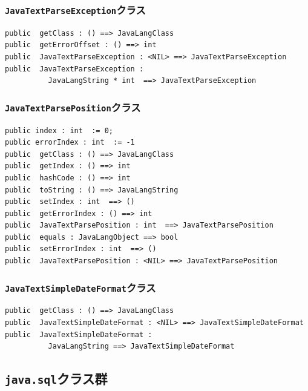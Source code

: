 \documentclass[\pformat,12pt]{jarticle}
\begin{document}
\subsubsection{\texttt{JavaTextParseException}クラス}
\begin{small}
\begin{verbatim}
public  getClass : () ==> JavaLangClass
public  getErrorOffset : () ==> int
public  JavaTextParseException : <NIL> ==> JavaTextParseException
public  JavaTextParseException : 
          JavaLangString * int  ==> JavaTextParseException
\end{verbatim}
\end{small}

\subsubsection{\texttt{JavaTextParsePosition}クラス}
\begin{small}
\begin{verbatim}
public index : int  := 0;
public errorIndex : int  := -1
public  getClass : () ==> JavaLangClass
public  getIndex : () ==> int
public  hashCode : () ==> int
public  toString : () ==> JavaLangString
public  setIndex : int  ==> ()
public  getErrorIndex : () ==> int
public  JavaTextParsePosition : int  ==> JavaTextParsePosition
public  equals : JavaLangObject ==> bool
public  setErrorIndex : int  ==> ()
public  JavaTextParsePosition : <NIL> ==> JavaTextParsePosition
\end{verbatim}
\end{small}

\subsubsection{\texttt{JavaTextSimpleDateFormat}クラス}
\begin{small}
\begin{verbatim}
public  getClass : () ==> JavaLangClass
public  JavaTextSimpleDateFormat : <NIL> ==> JavaTextSimpleDateFormat
public  JavaTextSimpleDateFormat : 
          JavaLangString ==> JavaTextSimpleDateFormat
\end{verbatim}
\end{small}

\subsection{\texttt{java.sql}クラス群}
\end{document}
